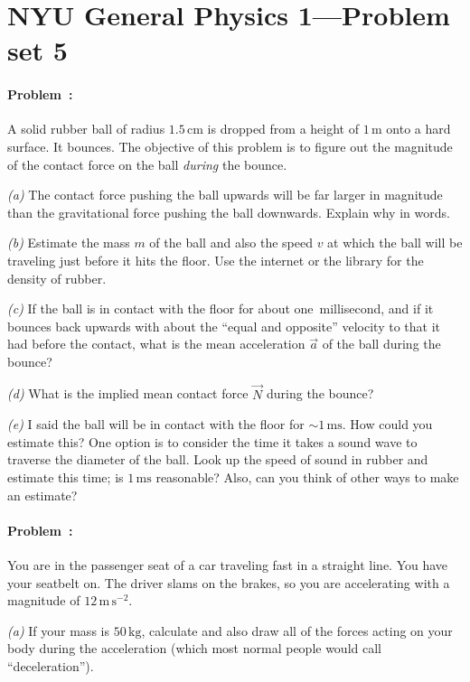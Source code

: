 \documentclass[12pt]{article}
\newcommand{\kg}{\mathrm{kg}}
\newcommand{\m}{\mathrm{m}}
\newcommand{\cm}{\mathrm{cm}}
\newcommand{\s}{\mathrm{s}}
\newcommand{\ms}{\mathrm{ms}}
\begin{document}
\thispagestyle{empty}

\section*{NYU General Physics 1---Problem set 5}

\paragraph{Problem~\theproblem:}%
A solid rubber ball of radius $1.5\,\cm$ is dropped from a height of
$1\,\m$ onto a hard surface.  It bounces.  The objective of this
problem is to figure out the magnitude of the contact force on the
ball \emph{during} the bounce.

\textsl{(a)} The contact force pushing the ball upwards will be far
larger in magnitude than the gravitational force pushing the ball
downwards.  Explain why in words.

\textsl{(b)} Estimate the mass $m$ of the ball and also the speed $v$
at which the ball will be traveling just before it hits the floor.
Use the internet or the library for the density of rubber.

\textsl{(c)} If the ball is in contact with the floor for about
one~millisecond, and if it bounces back upwards with about the ``equal
and opposite'' velocity to that it had before the contact, what is the
mean acceleration $\vec{a}$ of the ball during the bounce?

\textsl{(d)} What is the implied mean contact force $\vec{N}$ during
the bounce?

\textsl{(e)} I said the ball will be in contact with the floor for
$\sim 1\,\ms$.  How could you estimate this?  One option is to
consider the time it takes a sound wave to traverse the diameter of
the ball.  Look up the speed of sound in rubber and estimate this
time; is $1\,\ms$ reasonable?  Also, can you think of other ways to
make an estimate?

\paragraph{Problem~\theproblem:}%
You are in the passenger seat of a car traveling fast in a straight
line.  You have your seatbelt on.  The driver slams on the brakes, so
you are accelerating with a magnitude of $12\,\m\,\s^{-2}$.

\textsl{(a)} If your mass is $50\,\kg$, calculate and also draw all of
the forces acting on your body during the acceleration (which most
normal people would call ``deceleration'').
\end{document}
